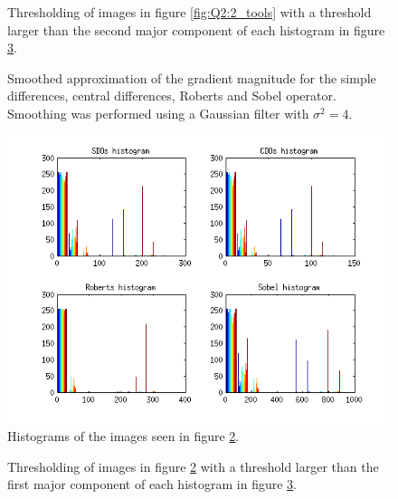 \begin{figure}[H]
	\centering
	\scalebox{0.9}{}
	\caption{Thresholding of images in figure \ref{fig:Q2:2_tools} with a threshold larger than the second major component of
	each histogram in figure \ref{fig:Q2:histogram_tools}.}
	\label{fig:Q2:threshold_tools_2}
\end{figure}


\begin{figure}[H]
	\centering
	\scalebox{0.7}{}
	\caption{Smoothed approximation of the gradient magnitude for the simple differences, central differences, Roberts and Sobel operator. Smoothing
	was performed using a Gaussian filter with $\sigma^2 = 4$.}
	\label{fig:Q2:2_tools_smoothed}
\end{figure}

\begin{figure}[H]
	\centering
	\includegraphics[scale=0.8]{./images/Q2/tools_smoothed/histogram_1.png}
	\caption{Histograms of the images seen in figure \ref{fig:Q2:2_tools_smoothed}.}
	\label{fig:Q2:histogram_tools}
\end{figure}


\begin{figure}[H]
	\centering
	\scalebox{0.9}{}
	\caption{Thresholding of images in figure \ref{fig:Q2:2_tools_smoothed} with a threshold larger than the first major component of
	each histogram in figure \ref{fig:Q2:histogram_tools}.}
	\label{fig:Q2:threshold_tools_smoothed_1}
\end{figure}

